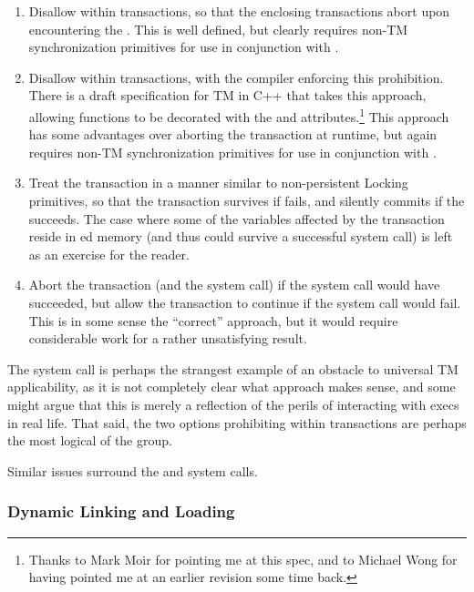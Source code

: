 \begin{enumerate}
\item	Disallow  within transactions, so that the enclosing
	transactions abort upon encountering the .
	This is well defined, but clearly requires non-TM synchronization
	primitives for use in conjunction with .
\item	Disallow  within transactions, with the compiler
	enforcing this prohibition.
	There is a draft specification for TM in C++ that takes
	this approach, allowing functions to be decorated with
	the  and 
	attributes.\footnote{
		Thanks to Mark Moir for pointing me at this spec, and
		to Michael Wong for having pointed me at an earlier
		revision some time back.}
	This approach has some advantages over aborting the transaction
	at runtime, but again requires non-TM synchronization primitives
	for use in conjunction with .
\item	Treat the transaction in a manner similar to non-persistent
	Locking primitives, so that the transaction survives if 
	fails, and silently commits if the  succeeds.
	The case where some of the variables affected by the transaction
	reside in ed memory (and thus could survive a successful
	 system call) is left as an exercise for the reader.
\item	Abort the transaction (and the  system call) if the
	 system call would have succeeded, but allow the
	transaction to continue if the  system call would
	fail.
	This is in some sense the ``correct'' approach, but it would
	require considerable work for a rather unsatisfying result.
\end{enumerate}

The  system call is perhaps the strangest example of an
obstacle to universal TM applicability, as it is not completely clear
what approach makes sense, and some might argue that this is merely a
reflection of the perils of interacting with execs in real life.
That said, the two options prohibiting  within transactions
are perhaps the most logical of the group.

Similar issues surround the  and  system calls.

\subsubsection{Dynamic Linking and Loading}
\label{sec:future:Dynamic Linking and Loading}

